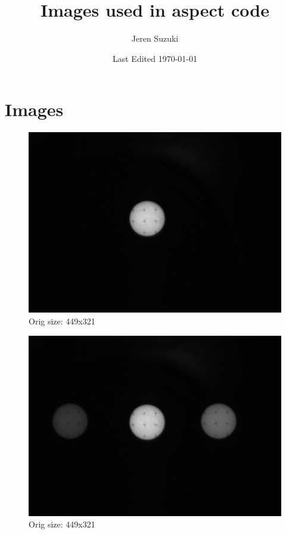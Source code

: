 \documentclass[10pt]{scrartcl}
\title{Images used in aspect code}
\author{Jeren Suzuki}
\date{Last Edited \today}
\begin{document}
\maketitle
{}
\tableofcontents
\clearpage
{}

\section{Images} %
\label{sec:images}


\begin{figure}[!ht]
    \centering
    \includegraphics[width=.9\textwidth]{../plots_tables_images/000.png}    
    \caption{Orig size: 449x321}
\end{figure}

\begin{figure}[!ht]
    \centering
    \includegraphics[width=.9\textwidth]{../plots_tables_images/dimsun3.png}    
    \caption{Orig size: 449x321}
\end{figure}
\end{document}
